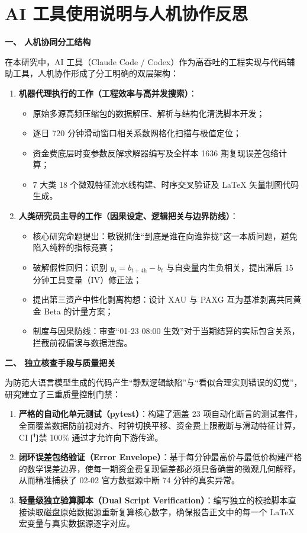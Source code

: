 \documentclass[UTF8,zihao=5,a4paper]{ctexart}
\newcommand{\key}[1]{\textbf{#1}}
\begin{document}
\clearpage
{\linespread{1.22}\selectfont
\setlength{\parskip}{3pt plus 0.5pt minus 0.5pt}
\section{AI 工具使用说明与人机协作反思}

\key{一、 人机协同分工结构}

在本研究中，AI 工具（Claude Code / Codex）作为高吞吐的工程实现与代码辅助工具，人机协作形成了分工明确的双层架构：
\begin{enumerate}[leftmargin=1.5em]
\item \key{机器代理执行的工作（工程效率与高并发搜索）}：
\begin{itemize}
\item 原始多源高频压缩包的数据解压、解析与结构化清洗脚本开发；
\item 逐日 720 分钟滑动窗口相关系数网格化扫描与极值定位；
\item 资金费底层时变参数反解求解器编写及全样本 1636 期复现误差包络计算；
\item 7 大类 18 个微观特征流水线构建、时序交叉验证及 LaTeX 矢量制图代码生成。
\end{itemize}
\item \key{人类研究员主导的工作（因果设定、逻辑把关与边界防线）}：
\begin{itemize}
\item 核心研究命题提出：敏锐抓住“到底是谁在向谁靠拢”这一本质问题，避免陷入纯粹的指标竞赛；
\item 破解假性回归：识别 $y_t = b_{t+4\text{h}} - b_t$ 与自变量内生负相关，提出滞后 15 分钟工具变量（IV）修正法；
\item 提出第三资产中性化剥离构想：设计 XAU 与 PAXG 互为基准剥离共同黄金 Beta 的计量方案；
\item 制度与因果防线：审查“01-23 08:00 生效”对于当期结算的实际包含关系，拦截前视偏误与数据泄露。
\end{itemize}
\end{enumerate}

\key{二、 独立核查手段与质量把关}

为防范大语言模型生成的代码产生“静默逻辑缺陷”与“看似合理实则错误的幻觉”，研究建立了三重质量控制门禁：
\begin{enumerate}[leftmargin=1.5em]
\item \key{严格的自动化单元测试（pytest）}：构建了涵盖 23 项自动化断言的测试套件，全面覆盖数据防前视对齐、时钟切换平移、资金费上限截断与滑动特征计算，CI 门禁 100\% 通过才允许向下游传递。
\item \key{闭环误差包络验证（Error Envelope）}：基于每分钟最高价与最低价构建严格的数学误差边界，使每一期资金费复现偏差都必须具备确凿的微观几何解释，从而精准捕获了 02-02 官方数据源中断 74 分钟的真实异常。
\item \key{轻量级独立验算脚本（Dual Script Verification）}：编写独立的校验脚本直接读取磁盘原始数据源重新复算核心数字，确保报告正文中的每一个 LaTeX 宏变量与真实数据源逐字对应。
\end{enumerate}

}
\end{document}
